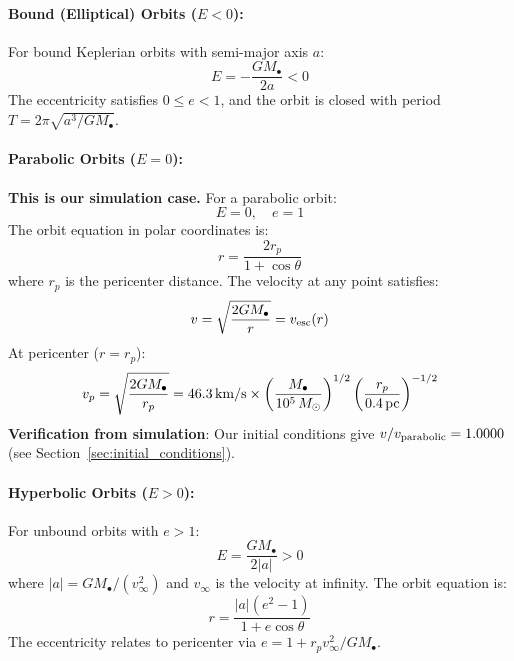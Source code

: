 \documentclass[twocolumn,amsmath,amssymb,prd,superscriptaddress,nofootinbib]{revtex4-2}
\begin{document}
\paragraph{Bound (Elliptical) Orbits ($E < 0$):}
For bound Keplerian orbits with semi-major axis $a$:
\begin{equation}
    E = -\frac{GM_\bullet}{2a} < 0
    \label{eq:E_a}
\end{equation}
The eccentricity satisfies $0 \leq e < 1$, and the orbit is closed with period $T = 2\pi\sqrt{a^3/GM_\bullet}$.

\paragraph{Parabolic Orbits ($E = 0$):}
\textbf{This is our simulation case.} For a parabolic orbit:
\begin{equation}
    E = 0, \quad e = 1
    \label{eq:E_parabolic}
\end{equation}
The orbit equation in polar coordinates is:
\begin{equation}
    r = \frac{2r_p}{1 + \cos\theta}
\end{equation}
where $r_p$ is the pericenter distance. The velocity at any point satisfies:
\begin{equation}
    v = \sqrt{\frac{2GM_\bullet}{r}} = v_{\rm esc}(r)
    \label{eq:v_parabolic}
\end{equation}
At pericenter ($r = r_p$):
\begin{equation}
    v_p = \sqrt{\frac{2GM_\bullet}{r_p}} = 46.3\,{\rm km/s} \times \left(\frac{M_\bullet}{10^5\,M_\odot}\right)^{1/2} \left(\frac{r_p}{0.4\,{\rm pc}}\right)^{-1/2}
\end{equation}
\textbf{Verification from simulation}: Our initial conditions give $v/v_{\rm parabolic} = 1.0000$ (see Section~\ref{sec:initial_conditions}).

\paragraph{Hyperbolic Orbits ($E > 0$):}
For unbound orbits with $e > 1$:
\begin{equation}
    E = \frac{GM_\bullet}{2|a|} > 0
    \label{eq:E_hyperbolic}
\end{equation}
where $|a| = GM_\bullet/(v_\infty^2)$ and $v_\infty$ is the velocity at infinity. The orbit equation is:
\begin{equation}
    r = \frac{|a|(e^2-1)}{1 + e\cos\theta}
\end{equation}
The eccentricity relates to pericenter via $e = 1 + r_p v_\infty^2/GM_\bullet$.
\end{document}
